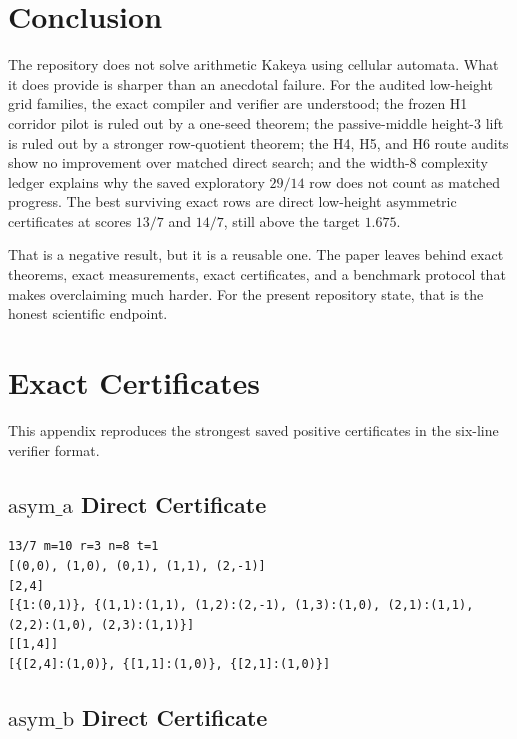 \documentclass[11pt]{article}
\theoremstyle{definition}
\begin{document}
\section{Conclusion}
\label{sec:conclusion}

The repository does not solve arithmetic Kakeya using cellular automata. What it does provide is sharper than an anecdotal failure. For the audited low-height grid families, the exact compiler and verifier are understood; the frozen \textsc{H1} corridor pilot is ruled out by a one-seed theorem; the passive-middle height-$3$ lift is ruled out by a stronger row-quotient theorem; the \textsc{H4}, \textsc{H5}, and \textsc{H6} route audits show no improvement over matched direct search; and the width-$8$ complexity ledger explains why the saved exploratory $29/14$ row does not count as matched progress. The best surviving exact rows are direct low-height asymmetric certificates at scores $13/7$ and $14/7$, still above the target $1.675$.

That is a negative result, but it is a reusable one. The paper leaves behind exact theorems, exact measurements, exact certificates, and a benchmark protocol that makes overclaiming much harder. For the present repository state, that is the honest scientific endpoint.

\appendix

\section{Exact Certificates}
\label{app:certificates}

This appendix reproduces the strongest saved positive certificates in the six-line verifier format.

\subsection{\texorpdfstring{$\mathrm{asym\_a}$}{asym\_a} Direct Certificate}

\begin{verbatim}
13/7 m=10 r=3 n=8 t=1
[(0,0), (1,0), (0,1), (1,1), (2,-1)]
[2,4]
[{1:(0,1)}, {(1,1):(1,1), (1,2):(2,-1), (1,3):(1,0), (2,1):(1,1),
(2,2):(1,0), (2,3):(1,1)}]
[[1,4]]
[{[2,4]:(1,0)}, {[1,1]:(1,0)}, {[2,1]:(1,0)}]
\end{verbatim}

\subsection{\texorpdfstring{$\mathrm{asym\_b}$}{asym\_b} Direct Certificate}
\end{document}
